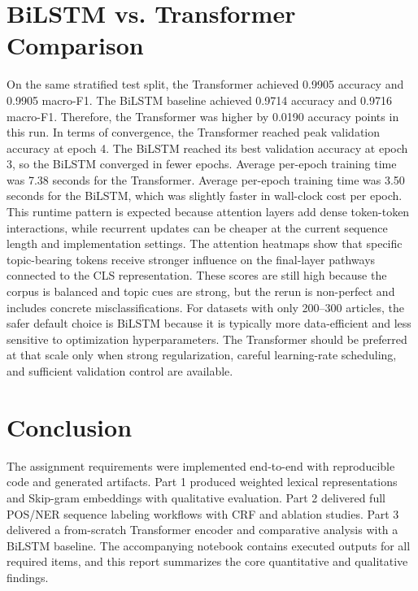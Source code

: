 \documentclass[12pt]{article}
\begin{document}
\section*{BiLSTM vs. Transformer Comparison}
On the same stratified test split, the Transformer achieved 0.9905 accuracy and 0.9905 macro-F1.
The BiLSTM baseline achieved 0.9714 accuracy and 0.9716 macro-F1.
Therefore, the Transformer was higher by 0.0190 accuracy points in this run.
In terms of convergence, the Transformer reached peak validation accuracy at epoch 4.
The BiLSTM reached its best validation accuracy at epoch 3, so the BiLSTM converged in fewer epochs.
Average per-epoch training time was 7.38 seconds for the Transformer.
Average per-epoch training time was 3.50 seconds for the BiLSTM, which was slightly faster in wall-clock cost per epoch.
This runtime pattern is expected because attention layers add dense token-token interactions, while recurrent updates can be cheaper at the current sequence length and implementation settings.
The attention heatmaps show that specific topic-bearing tokens receive stronger influence on the final-layer pathways connected to the CLS representation.
These scores are still high because the corpus is balanced and topic cues are strong, but the rerun is non-perfect and includes concrete misclassifications.
For datasets with only 200--300 articles, the safer default choice is BiLSTM because it is typically more data-efficient and less sensitive to optimization hyperparameters.
The Transformer should be preferred at that scale only when strong regularization, careful learning-rate scheduling, and sufficient validation control are available.

\section*{Conclusion}
The assignment requirements were implemented end-to-end with reproducible code and generated artifacts.
Part 1 produced weighted lexical representations and Skip-gram embeddings with qualitative evaluation.
Part 2 delivered full POS/NER sequence labeling workflows with CRF and ablation studies.
Part 3 delivered a from-scratch Transformer encoder and comparative analysis with a BiLSTM baseline.
The accompanying notebook contains executed outputs for all required items, and this report summarizes the core quantitative and qualitative findings.
\end{document}
